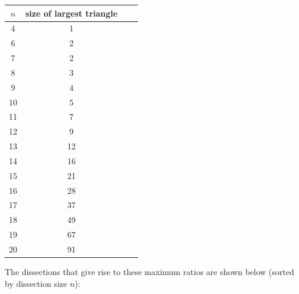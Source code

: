 \documentclass[12pt,amstags,fleqn]{article}
\theoremstyle{plain}
\theoremstyle{definition}
\begin{document}
\begin{center}
\begin{tabular}{|c|c|c|c|}
\hline
$n$ & size of largest triangle \\
\hline
\hline 4 & 1 \\
\hline 6 & 2 \\
\hline 7 & 2 \\
\hline 8 & 3 \\
\hline 9 & 4 \\
\hline 10 & 5 \\
\hline 11 & 7 \\
\hline 12 & 9 \\
\hline 13 & 12 \\
\hline 14 & 16 \\
\hline 15 & 21 \\
\hline 16 & 28 \\
\hline 17 & 37 \\
\hline 18 & 49 \\
\hline 19 & 67 \\
\hline 20 & 91 \\
\hline
\end{tabular}
\end{center}

The dissections that give rise to these maximum ratios are shown below
(sorted by dissection size $n$):
\end{document}

